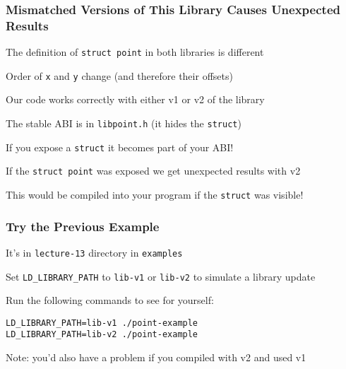   \begin{frame}[fragile]
    \frametitle{Mismatched Versions of This Library Causes Unexpected Results}

    The definition of \texttt{struct point} in both libraries is different

    \hspace{2em} Order of \texttt{x} and \texttt{y} change (and therefore their offsets)

    \vspace{2em}

    Our code works correctly with either v1 or v2 of the library

    \hspace{2em} The stable ABI is in \lstinline|libpoint.h| (it hides the \lstinline|struct|)

    \hspace{4em} If you expose a \lstinline|struct| it becomes part of your ABI!

    \vspace{2em}

    If the \texttt{struct point} was exposed we get unexpected results with v2

    \hspace{2em} This would be compiled into your program if the \texttt{struct}
    was visible!
  \end{frame}

  \begin{frame}[fragile]
    \frametitle{Try the Previous Example}

    It's in \lstinline|lecture-13| directory in \texttt{examples}

    \vspace{2em}

    Set \texttt{LD\_LIBRARY\_PATH} to \lstinline|lib-v1| or \lstinline|lib-v2|
    to simulate a library update

    \vspace{2em}

    Run the following commands to see for yourself:
    \begin{lstlisting}[commentstyle={}, xleftmargin=2em]
LD_LIBRARY_PATH=lib-v1 ./point-example
LD_LIBRARY_PATH=lib-v2 ./point-example
    \end{lstlisting}

    \vspace{2em}

    Note: you'd also have a problem if you compiled with v2 and used v1
  \end{frame}

